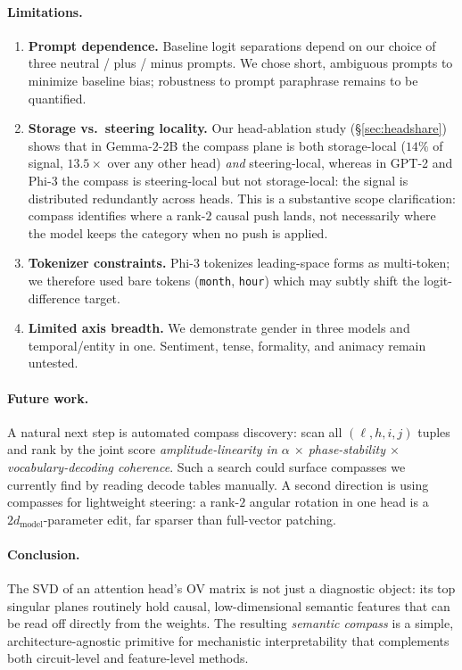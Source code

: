 \paragraph{Limitations.}
\begin{enumerate}
    \item \textbf{Prompt dependence.} Baseline logit separations depend
    on our choice of three neutral / plus / minus prompts. We chose
    short, ambiguous prompts to minimize baseline bias; robustness to
    prompt paraphrase remains to be quantified.
    \item \textbf{Storage vs.\ steering locality.} Our head-ablation
    study (\S\ref{sec:headshare}) shows that in Gemma-2-2B the compass
    plane is both storage-local ($14\%$ of signal, $13.5\times$ over
    any other head) \emph{and} steering-local, whereas in GPT-2 and
    Phi-3 the compass is steering-local but not storage-local: the
    signal is distributed redundantly across heads. This is a
    substantive scope clarification: compass identifies where a rank-$2$
    causal push lands, not necessarily where the model keeps the
    category when no push is applied.
    \item \textbf{Tokenizer constraints.} Phi-3 tokenizes leading-space
    forms as multi-token; we therefore used bare tokens (\texttt{month},
    \texttt{hour}) which may subtly shift the logit-difference target.
    \item \textbf{Limited axis breadth.} We demonstrate gender in three
    models and temporal/entity in one. Sentiment, tense, formality,
    and animacy remain untested.
\end{enumerate}

\paragraph{Future work.} A natural next step is automated compass
discovery: scan all $(\ell, h, i, j)$ tuples and rank by the joint score
\emph{amplitude-linearity in $\alpha$ $\times$ phase-stability $\times$
vocabulary-decoding coherence}. Such a search could surface compasses
we currently find by reading decode tables manually. A second direction
is using compasses for lightweight steering: a rank-$2$ angular rotation
in one head is a $2 d_\text{model}$-parameter edit, far sparser than
full-vector patching.

\paragraph{Conclusion.} The SVD of an attention head's OV matrix is
not just a diagnostic object: its top singular planes routinely hold
causal, low-dimensional semantic features that can be read off directly
from the weights. The resulting \emph{semantic compass} is a simple,
architecture-agnostic primitive for mechanistic interpretability that
complements both circuit-level and feature-level methods.
